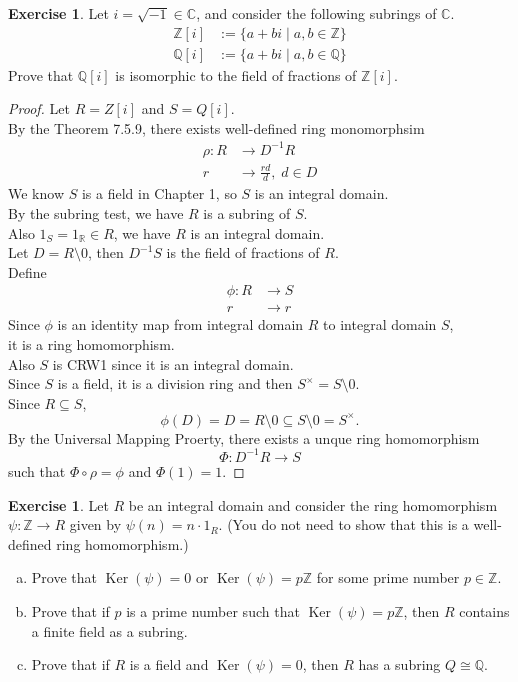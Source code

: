 \documentclass{article}
\newcommand{\bbr}{\mathbb{R}}
\newcommand{\bbc}{\mathbb{C}}
\newcommand{\bbz}{\mathbb{Z}}
\newcommand{\bbq}{\mathbb{Q}}
\renewcommand{\ker}{\operatorname{Ker}}
\theoremstyle{plain}
\theoremstyle{definition}
\newtheorem{exer}[lem]{Exercise}
\begin{document}
\begin{exer}
Let $i=\sqrt{-1}\in\bbc$, and consider the following subrings of $\bbc$.
\begin{align*}
\bbz[i]&:=\{a+bi\mid a,b\in\bbz\}
\\
\bbq[i]&:=\{a+bi\mid a,b\in\bbq\}
\end{align*}
Prove that $\bbq[i]$ is isomorphic to the field of fractions of $\bbz[i]$.
\begin{proof}
    Let $R = Z[i]$ and $S = Q[i]$.\\
    By the Theorem 7.5.9, there exists well-defined ring monomorphsim 
    \begin{align*}
        \rho: R &\to D^{-1}R \\
        r &\to \frac{rd}{d} ,\; d\in D
    \end{align*}
    We know $S$ is a field in Chapter 1, so $S$ is an integral domain.\\
    By the subring test, we have $R$ is a subring of $S$.\\
    Also $1_S = 1_\bbr \in R$, we have $R$ is an integral domain.\\
    Let $D = R\setminus 0$, then $D^{-1}S$ is the field of fractions of $R$.\\
   Define
   \begin{align*}
       \phi: R &\to S \\
             r &\to r
   \end{align*}
   Since $\phi$ is an identity map from integral domain $R$ to integral domain $S$, \\
   it is a ring homomorphism.\\
   Also $S$ is CRW1 since it is an integral domain.\\
   Since $S$ is a field, it is a division ring and then $S^{\times} = S\setminus 0$.\\
   Since $R \subseteq S$,
   \[\phi(D) = D = R\setminus 0 \subseteq S\setminus 0 = S^{\times}.\]    By the Universal Mapping Proerty, there exists a unque ring homomorphism 
   \[\Phi:D^{-1}R \to S\]
   such that $\Phi\circ \rho = \phi$ and $\Phi(1) = 1$.



\end{proof}

\end{exer}

\begin{exer}
Let $R$ be an integral domain and consider the ring homomorphism $\psi\colon\bbz\to R$ given by $\psi(n)=n\cdot 1_R$.
(You do not need to show that this is a well-defined ring homomorphism.)
\begin{enumerate}[(a)]
\item Prove that $\ker(\psi)=0$ or $\ker(\psi)=p\bbz$ for some prime number $p\in\bbz$.
\item Prove that if $p$ is a prime number such that $\ker(\psi)=p\bbz$, then $R$ contains a finite field as a subring.
\item Prove that if $R$ is a field and $\ker(\psi)=0$, then $R$ has a subring $Q\cong\bbq$.
\end{enumerate}
\end{exer}
\end{document}
